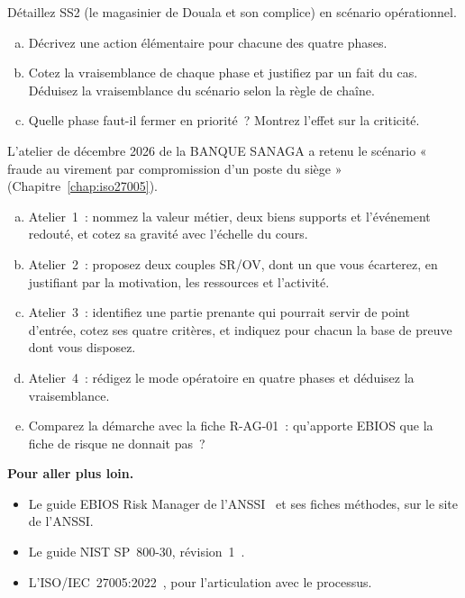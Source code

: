 \begin{boxexo}[title={\ding{45}\quad Exercice~4.3. Le mode opératoire de SS2 \niveaumoyen}]
Détaillez SS2 (le magasinier de Douala et son complice) en scénario
opérationnel.
\begin{enumerate}[(a)]
    \item Décrivez une action élémentaire pour chacune des quatre phases.
    \item Cotez la vraisemblance de chaque phase et justifiez par un fait du
          cas. Déduisez la vraisemblance du scénario selon la règle de
          chaîne.
    \item Quelle phase faut-il fermer en priorité~? Montrez l'effet sur la
          criticité.
\end{enumerate}
\end{boxexo}

\begin{boxexo}[title={\ding{45}\quad Exercice~4.4. EBIOS à la BANQUE SANAGA \niveauexpert}]
L'atelier de décembre 2026 de la BANQUE SANAGA a retenu le scénario
« fraude au virement par compromission d'un poste du siège »
(Chapitre~\ref{chap:iso27005}).
\begin{enumerate}[(a)]
    \item Atelier~1~: nommez la valeur métier, deux biens supports et
          l'événement redouté, et cotez sa gravité avec l'échelle du cours.
    \item Atelier~2~: proposez deux couples SR/OV, dont un que vous
          écarterez, en justifiant par la motivation, les ressources et
          l'activité.
    \item Atelier~3~: identifiez une partie prenante qui pourrait servir de
          point d'entrée, cotez ses quatre critères, et indiquez pour chacun
          la base de preuve dont vous disposez.
    \item Atelier~4~: rédigez le mode opératoire en quatre phases et
          déduisez la vraisemblance.
    \item Comparez la démarche avec la fiche R-AG-01~: qu'apporte EBIOS que
          la fiche de risque ne donnait pas~?
\end{enumerate}
\end{boxexo}

\bigskip

\begin{boxinfo}
\textbf{Pour aller plus loin.}
\begin{itemize}
    \item Le guide EBIOS Risk Manager de l'ANSSI~\cite{anssi2018ebios} et ses
          fiches méthodes, sur le site de l'ANSSI.
    \item Le guide NIST SP~800-30, révision~1~\cite{nist2012sp80030}.
    \item L'ISO/IEC~27005:2022~\cite{iso27005_2022}, pour l'articulation
          avec le processus.
\end{itemize}
\end{boxinfo}

